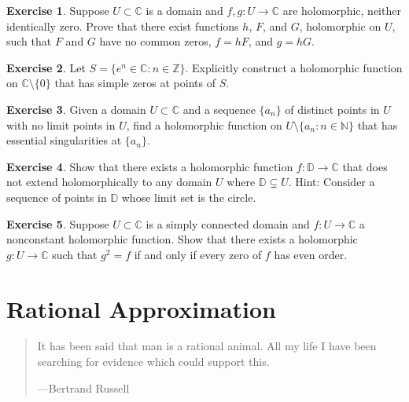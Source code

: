 \documentclass[12pt,openany]{book}
\newcommand{\C}{{\mathbb{C}}}
\newcommand{\Z}{{\mathbb{Z}}}
\newcommand{\N}{{\mathbb{N}}}
\newcommand{\D}{{\mathbb{D}}}
\theoremstyle{plain}
\theoremstyle{remark}
\theoremstyle{definition}
\newenvironment{exbox}{%
    \def\FrameCommand{\vrule width 1pt \relax\hspace{10pt}}%
    \MakeFramed{\advance\hsize-\width\FrameRestore}%
}{%
    \endMakeFramed
}
\newenvironment{myepigraph}{%
    \begin{quote}%
    \begingroup\itshape
}{%
    \endgroup%
    \end{quote}
}
\theoremstyle{exercise}
\newtheorem{exercise}{Exercise}[section]
\theoremstyle{example}
\begin{document}
\begin{exbox}
\begin{exercise}
Suppose $U \subset \C$ is a domain and $f,g \colon U \to \C$ are holomorphic,
neither identically zero.  Prove that there exist functions $h$, $F$,
and $G$, holomorphic on $U$, such that $F$ and $G$ have no common zeros,
$f=hF$, and $g=hG$.
\end{exercise}

\begin{exercise}
Let $S = \bigl\{ e^n \in \C : n \in \Z \bigr\}$.
Explicitly construct a holomorphic function on $\C \setminus \{ 0 \}$
that has simple zeros at
points of $S$.
\end{exercise}

\begin{exercise}
Given a domain $U \subset \C$ and a sequence $\{ a_n \}$ of distinct points in $U$
with no limit points in $U$, find a holomorphic function on
$U \setminus \{ a_n : n \in \N \}$ that has essential
singularities at $\{ a_n \}$.
\end{exercise}

\begin{exercise}
Show that there exists a holomorphic function $f \colon \D \to \C$ that does
not extend holomorphically to any domain $U$ where $\D \subsetneq U$.  Hint:
Consider a sequence of points in $\D$ whose limit set is the circle.
\end{exercise}

\begin{exercise}
Suppose $U \subset \C$ is a simply connected domain and $f \colon U \to \C$
a nonconstant holomorphic function.  Show that there exists a holomorphic $g \colon U
\to \C$ such that $g^2 = f$ if and only if every zero of $f$ has even order.
\end{exercise}
\end{exbox}


\chapter{Rational Approximation} \label{ch:runge}

\begin{myepigraph}
It has been said that man is a rational animal. All my life I have been searching for evidence which could support this.

---Bertrand Russell
\end{myepigraph}
\end{document}
